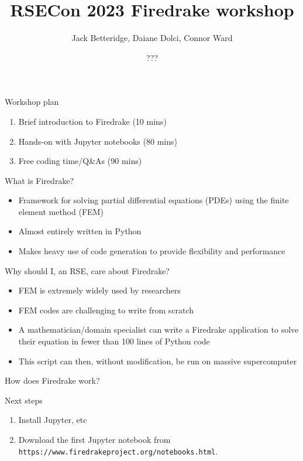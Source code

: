 \documentclass[aspectratio=169]{beamer}
\title{RSECon 2023 Firedrake workshop}
\author{Jack Betteridge, Daiane Dolci, Connor Ward}
\date{???}
\begin{document}
\frame{\titlepage}

\begin{frame}{Workshop plan}
  \begin{enumerate}
    \item Brief introduction to Firedrake (10 mins)
    \item Hands-on with Jupyter notebooks (80 mins)
    \item Free coding time/Q\&As (90 mins)
  \end{enumerate}
\end{frame}

\begin{frame}{What is Firedrake?}

  \begin{itemize}
    \item Framework for solving partial differential equations (PDEs) using the finite element method (FEM)
    \item Almost entirely written in Python
    \item Makes heavy use of code generation to provide flexibility and performance
  \end{itemize}

\end{frame}

\begin{frame}{Why should I, an RSE, care about Firedrake?}
  \begin{itemize}
    \item FEM is extremely widely used by researchers
    \item FEM codes are challenging to write from scratch
    \item A mathematician/domain specialist can write a Firedrake application to solve their equation in fewer than 100 lines of Python code
    \item This script can then, without modification\*, be run on massive supercomputer
  \end{itemize}
\end{frame}

\begin{frame}{How does Firedrake work?}

\end{frame}

\begin{frame}{Next steps}
  \begin{enumerate}
    \item Install Jupyter, etc
    \item Download the first Jupyter notebook from \texttt{https://www.firedrakeproject.org/notebooks.html}.
  \end{enumerate}
\end{frame}
\end{document}
